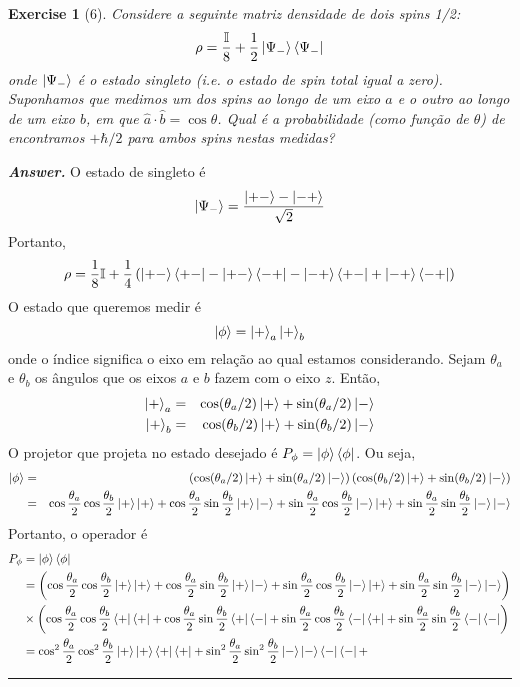 \documentclass[12pt]{article}
\def\be{\begin{equation}}
\def\ee{\end{equation}}
\def\bea{\begin{eqnarray*}}
\def\eea{\end{eqnarray*}}
\def\f{\frac}
\def\l{\left}
\def\r{\right}
\newtheorem{exercise}{Exercise}
\newenvironment{answer}{\noindent\textbf{\textit{Answer.}} \normalfont }{\par\noindent\rule{\textwidth}{0.4pt}}
\begin{document}
	\begin{exercise}[6]
		Considere a seguinte matriz densidade de dois spins 1/2:
		\be
			\rho = \f{\mathbb{I}}{8} + \f{1}{2} \ket{\Psi_-}\bra{\Psi_-}
		\ee
		onde $\ket{\Psi_-}$ é o estado singleto (i.e. o estado de spin total igual a zero). Suponhamos que medimos um dos spins ao longo de um eixo $a$ e o outro ao longo de um eixo $b$, em que  $\hat{a}\cdot\hat{b} = \cos\theta$. Qual é a probabilidade (como função de $\theta$) de encontramos	$+\hbar/2$ para ambos spins nestas medidas?
	\end{exercise}
	\begin{answer}
		O estado de singleto é 
		\be
			\ket{\Psi_-} = \f{\ket{+-} - \ket{-+}}{\sqrt{2}}
		\ee
		Portanto,
		\be
			\rho = \f{1}{8}\mathbb{I} + \f{1}{4}\l( \ket{+-}\bra{+-} - \ket{+-}\bra{-+} - \ket{-+}\bra{+-} + \ket{-+}\bra{-+} \r)
		\ee
		O estado que queremos medir é
		\be
			\ket{\phi} = \ket{+}_a\ket{+}_b
		\ee
		onde o índice significa o eixo em relação ao qual estamos considerando. Sejam $\theta_a$ e $\theta_b$ os ângulos que os eixos $a$ e $b$ fazem com o eixo $z$. Então,
		\bea
			\ket{+}_a &=& \cos(\theta_a/2)\ket{+} + \sin(\theta_a/2)\ket{-} \\
			\ket{+}_b &=& \cos(\theta_b/2)\ket{+} + \sin(\theta_b/2)\ket{-} 
		\eea
		O projetor que projeta no estado desejado é $P_\phi = \ket{\phi}\bra{\phi}$. Ou seja,
		\bea
			\ket{\phi} &=& \l(\cos(\theta_a/2)\ket{+} + \sin(\theta_a/2)\ket{-} \r)\l( \cos(\theta_b/2)\ket{+} + \sin(\theta_b/2)\ket{-} \r) \\
				&=& \cos\f{\theta_a}{2}\cos\f{\theta_b}{2}\ket{+}\ket{+} + \cos\f{\theta_a}{2}\sin\f{\theta_b}{2}\ket{+}\ket{-} + \sin\f{\theta_a}{2}\cos\f{\theta_b}{2}\ket{-}\ket{+} + \sin\f{\theta_a}{2}\sin\f{\theta_b}{2}\ket{-}\ket{-}
		\eea
		Portanto, o operador é
		\begin{align*}
			P_\phi &= \ket{\phi}\bra{\phi} \\
			&= \left(\cos\frac{\theta_a}{2}\cos\frac{\theta_b}{2}\ket{+}\ket{+} + \cos\frac{\theta_a}{2}\sin\frac{\theta_b}{2}\ket{+}\ket{-} + \sin\frac{\theta_a}{2}\cos\frac{\theta_b}{2}\ket{-}\ket{+} + \sin\frac{\theta_a}{2}\sin\frac{\theta_b}{2}\ket{-}\ket{-}\right) \\
			&\times \left(\cos\frac{\theta_a}{2}\cos\frac{\theta_b}{2}\bra{+}\bra{+} + \cos\frac{\theta_a}{2}\sin\frac{\theta_b}{2}\bra{+}\bra{-} + \sin\frac{\theta_a}{2}\cos\frac{\theta_b}{2}\bra{-}\bra{+} + \sin\frac{\theta_a}{2}\sin\frac{\theta_b}{2}\bra{-}\bra{-}\right) \\
			&= 	 \cos^2\frac{\theta_a}{2}\cos^2\frac{\theta_b}{2}\ket{+}\ket{+}\bra{+}\bra{+} + \sin^2\frac{\theta_a}{2}\sin^2\frac{\theta_b}{2}\ket{-}\ket{-}\bra{-}\bra{-} + \\

\end{align*}
\end{answer}
\end{document}
